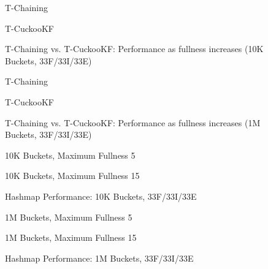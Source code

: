 \begin{figure}[H]
    \centering
    \begin{minipage}{0.7\textwidth}
    \caption*{T-Chaining}
        \vspace{12pt}
    \end{minipage}
    \begin{minipage}{0.7\textwidth}
    \caption*{T-CuckooKF}
    \end{minipage}
    \caption{T-Chaining vs. T-CuckooKF: Performance as fullness increases (10K Buckets, 33F/33I/33E)}
    \label{fig:hm_fullness_33_1}
\end{figure}

\begin{figure}[H]
    \centering
    \begin{minipage}{0.7\textwidth}
    \caption*{T-Chaining}
        \vspace{12pt}
    \end{minipage}
    \begin{minipage}{0.7\textwidth}
    \caption*{T-CuckooKF}
    \end{minipage}
    \caption{T-Chaining vs. T-CuckooKF: Performance as fullness increases (1M Buckets, 33F/33I/33E)}
    \label{fig:hm_fullness_33_2}
\end{figure}

\begin{figure}[H]
    \centering
    \begin{minipage}{0.75\textwidth}
    \caption*{10K Buckets, Maximum Fullness 5}
        \vspace{12pt}
    \end{minipage}
   \begin{minipage}{0.75\textwidth}
    \caption*{10K Buckets, Maximum Fullness 15}
    \end{minipage}
	\caption{Hashmap Performance: 10K Buckets, 33F/33I/33E}
    \label{fig:hm_33_1}
\end{figure}

\begin{figure}[H]
    \centering
    \begin{minipage}{0.75\textwidth}
    \caption*{1M Buckets, Maximum Fullness 5}
        \vspace{12pt}
    \end{minipage}
   \begin{minipage}{0.75\textwidth}
    \caption*{1M Buckets, Maximum Fullness 15}
        \vspace{12pt}
    \end{minipage}
	\caption{Hashmap Performance: 1M Buckets, 33F/33I/33E}
    \label{fig:hm_33_3}
\end{figure}

